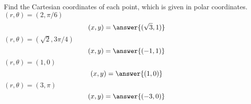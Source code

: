 \begin{problem}
Find the Cartesian coordinates of each point, which is given in polar coordinates.
$(r,\theta) = (2, \pi/6)$
\[
(x,y) = \answer{(\sqrt{3},1)}
\]
$(r,\theta) = (\sqrt{2}, 3\pi/4)$
\[
(x,y) = \answer{(-1,1)}
\]
$(r,\theta) = (1, 0)$
\[
(x,y) = \answer{(1,0)}
\]
$(r,\theta) = (3, \pi)$
\[
(x,y) = \answer{(-3,0)}
\]
\end{problem}